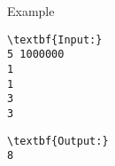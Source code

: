 Example
\begin{verbatim}
\textbf{Input:}
5 1000000
1
1
3
3\end{verbatim}
\begin{verbatim}
\textbf{Output:}
8\end{verbatim}